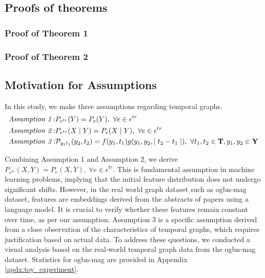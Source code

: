 \subsection{Proofs of theorems}\label{apdx:proofs}
\subsubsection{Proof of Theorem 1}


\subsubsection{Proof of Theorem 2}





\subsection{Motivation for Assumptions}\label{apdx:assumptions}
In this study, we make three assumptions regarding temporal graphs.
\begin{align}
    \textit{Assumption 1}: &P_{e^{te}}(Y) = P_e(Y), \ \forall e \in \epsilon^{tr}\\
    \textit{Assumption 2}: &P_{e^{te}}(X\mid Y) = P_e(X\mid Y), \ \forall e \in \epsilon^{tr}\\
    \textit{Assumption 3}: &\mathcal{P}_{y_1 t_1} (y_2 ,t_2) = f(y_1, t_1) g(y_1, y_2, \mid t_2-t_1\mid), \ \forall t_1, t_2 \in \bold{T}, y_1, y_2\in \bold{Y}
\end{align}

Combining Assumption 1 and Assumption 2, we derive $P_{e^{te}}(X, Y) = P_e(X, Y), \ \forall e \in \epsilon^{tr}$. This is fundamental assumption in machine learning problems, implying that the initial feature distribution does not undergo significant shifts. However, in the real world graph dataset such as ogbn-mag dataset, features are embeddings derived from the abstracts of papers using a language model. It is crucial to verify whether these features remain constant over time, as per our assumption. Assumption 3 is a specific assumption derived from a close observation of the characteristics of temporal graphs, which requires justification based on actual data. To address these questions, we conducted a visual analysis based on the real-world temporal graph data from the ogbn-mag dataset. Statistics for ogbn-mag are provided in Appendix \ref{apdx:toy_experiment}.

